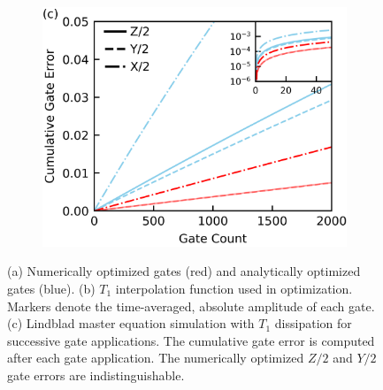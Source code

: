 \begin{figure}[ht]
\begin{subfigure}{.23\textwidth}
    \caption{\label{fig:longitudeb}}
  \end{subfigure}\hfill
  \begin{subfigure}{.4\textwidth}
    \includegraphics[width=\linewidth]{assets/f1c.png}
    \caption{\label{fig:longitudec}}
  \end{subfigure}
  \caption{
    (a) Numerically optimized gates (red) and analytically optimized gates (blue).
    (b) $T_{1}$ interpolation function used in optimization. Markers
    denote the time-averaged, absolute amplitude of each gate.
    (c) Lindblad master equation simulation with $T_{1}$ dissipation
    for successive gate applications. The cumulative
    gate error is computed after each gate application.
    The numerically optimized $Z/2$ and $Y/2$ gate errors are indistinguishable.
  }
  \label{fig:longitude}
\end{figure}

